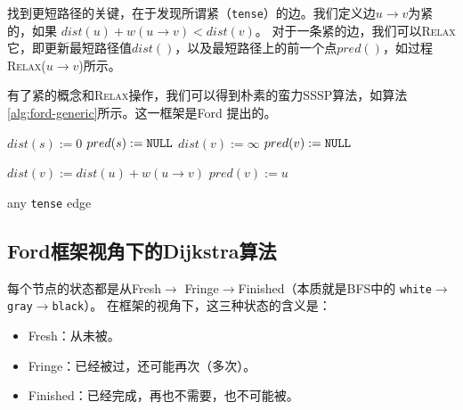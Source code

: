 找到更短路径的关键，在于发现所谓紧（\texttt{tense}）的边。我们定义边$u\rightarrow v$为紧的，如果 $dist(u)+w(u\rightarrow v) < dist(v)$。
对于一条紧的边，我们可以\textsc{Relax}它，即更新最短路径值$dist()$，以及最短路径上的前一个点$pred()$，如过程\textsc{Relax($u\rightarrow v$)}所示。%

有了紧的概念和\textsc{Relax}操作，我们可以得到朴素的蛮力SSSP算法，如算法\ref{alg:ford-generic}所示。这一框架是Ford 提出的。

\begin{algorithm}
    \begin{algorithmic}[1]
            \State $dist(s) := 0$
            \State $pred(s) := \text{\texttt{NULL}}$
                \State $dist(v) := \infty$
                \State $pred(v) := \text{\texttt{NULL}}$
            \EndFor
        \EndProcedure
    \end{algorithmic}
\end{algorithm}

\begin{algorithm}
    \begin{algorithmic}[1]
            \State $dist(v) := dist(u)+w(u\rightarrow v)$
            \State $pred(v) := u$
        \EndProcedure
    \end{algorithmic}
\end{algorithm}

\begin{algorithm}[htbp]
    \caption{($s$)}
    \label{alg:ford-generic}
    \begin{algorithmic}[1]
        \State {}
            \State {} any \textnormal{\texttt{tense}} edge
        \EndWhile
    \end{algorithmic}
\end{algorithm}

\subsection{Ford框架视角下的Dijkstra算法}

每个节点的状态都是从Fresh$\rightarrow$ Fringe$\rightarrow$Finished（本质就是BFS中的
    \texttt{white}$\rightarrow$\texttt{gray}$\rightarrow$\texttt{black}）。
在框架的视角下，这三种状态的含义是：
\begin{itemize}
    \item Fresh：从未被。
    \item Fringe：已经被过，还可能再次（多次）。
    \item Finished：已经完成，再也不需要，也不可能被。
\end{itemize}

